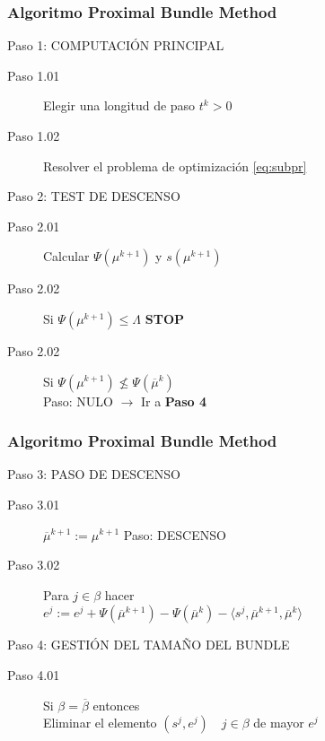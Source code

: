 \documentclass[xcolor=dvipsnames, utf8, spanish]{beamer} %
\begin{document}
\begin{frame}
	\frametitle{Algoritmo Proximal Bundle Method}
	\begingroup
		\begin{block} {Paso 1: COMPUTACIÓN PRINCIPAL}
			\begin{description}
				\item [Paso 1.01] Elegir una longitud de paso $t^k > 0$
				\item [Paso 1.02] Resolver el problema de optimización \eqref{eq:subpr}
			\end{description}
		\end{block}
		\begin{block} {Paso 2: TEST DE DESCENSO}
			\begin{description}
				\item [Paso 2.01] Calcular $\Psi(\mu^{k+1})$ y $s(\mu^{k+1})$
				\item [Paso 2.02] Si $\Psi(\mu^{k+1}) \leq \Lambda$ \textbf{STOP} \\
				\item [Paso 2.02] Si $\Psi(\mu^{k+1}) \nleq \Psi(\overline{\mu}^{k})$ \\
				Paso: NULO $\rightarrow$ Ir a \textbf{Paso 4}
			\end{description}
		\end{block}
	\endgroup
\end{frame}

\begin{frame}
	\frametitle{Algoritmo Proximal Bundle Method}
	\begingroup
		\begin{block} {Paso 3: PASO DE DESCENSO}
			\begin{description}
				\item [Paso 3.01] $\overline{\mu}^{k+1}:= \mu^{k+1}$ Paso: DESCENSO
				\item [Paso 3.02] Para $j \in \beta$ hacer \\
				$e^j := e^j + \Psi(\overline{\mu}^{k+1})-\Psi(\overline{\mu}^{k})-\langle 	s^j,\overline{\mu}^{k+1},\overline{\mu}^{k} \rangle$		
			\end{description}
		\end{block}
		\begin{block} {Paso 4: GESTIÓN DEL TAMAÑO DEL BUNDLE}
			\begin{description}
				\item [Paso 4.01] Si $\beta = \overline{\beta}$ entonces \\
				Eliminar el elemento $(s^j,e^j) \quad j  \in \beta$ de mayor $e^j$
			\end{description}
		\end{block}
	\endgroup
\end{frame}
\end{document}
